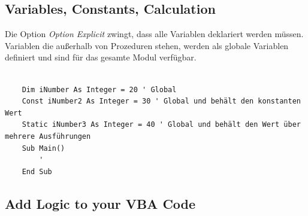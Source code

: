 \subsection{Variables, Constants, Calculation}
Die Option \textit{Option Explicit} zwingt, dass alle Variablen deklariert werden müssen.
Variablen die außerhalb von Prozeduren stehen, werden als globale Variablen definiert und sind für das gesamte Modul verfügbar. 
\begin{lstlisting}[style=VBA]

	Dim iNumber As Integer = 20 ' Global
	Const iNumber2 As Integer = 30 ' Global und behält den konstanten Wert
	Static iNumber3 As Integer = 40 ' Global und behält den Wert über mehrere Ausführungen
	Sub Main()
		'
	End Sub
\end{lstlisting} 
\subsection{Add Logic to your VBA Code}
